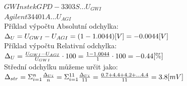 \documentclass{article}
\begin{document}
\begin{figure}[H]
\begin{minipage}[t]{0.4\textwidth}
    \end{minipage}
    \hfill
    \begin{minipage}[t]{0.6\textwidth}
        \vspace{-10mm}
    \end{minipage}
\end{figure}

\vspace{5mm}
\(
    GWInstek GPD-3303S ... U_{GWI}
\)
\\
\vspace{5mm}
\(
    Agilent 34401A      ... U_{AGI}
\)\\
\vspace{5mm}
Příklad výpočtu Absolutní odchylka: 
\(
    \Delta_U = U_{GWI} - U_{AGI} = (1 - 1.0044)\-[V]= -0.0044\-[V]
\)\\
\vspace{5mm}
Příklad výpočtu Relativní odchylka: \(
    \Delta_U = \frac{U_{GWI} - U_{AGI}}{U_{GWI}}\cdot100 = \frac{1 - 1.0044}{1}\cdot100 = -0.44\-[\%]
\)\\
\vspace{5mm}
Střední odchylku můžeme určit jako:
\(
    \Delta_{str} = \Sigma_{i=1}^{n}\frac{\Delta_{Ui}}{n} = \Sigma_{i=1}^{11}\frac{\Delta_{Ui}}{11} = \frac{0.7 + 4.4 + 4.2 + ... 4.4}{11} = 3.8\-[mV]
\)
\end{document}
